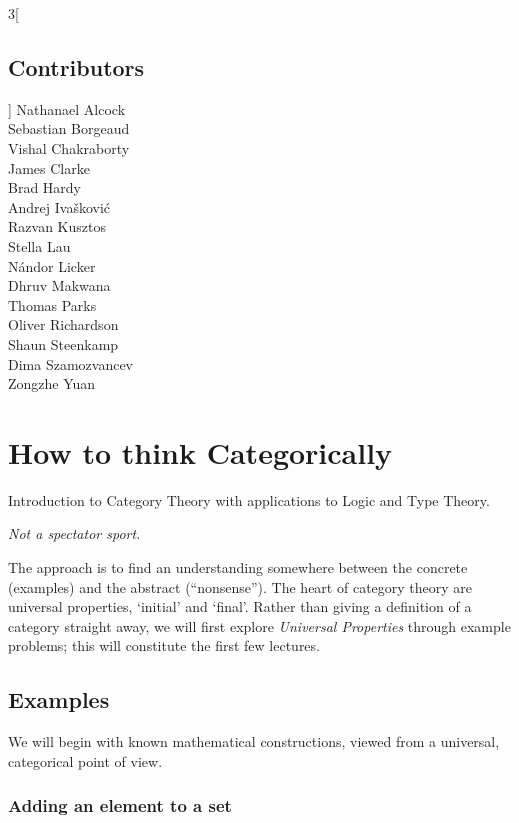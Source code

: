 \thispagestyle{plain}
\begin{multicols}{3}[\section*{Contributors}]
Nathanael Alcock\\
Sebastian Borgeaud\\
Vishal Chakraborty\\
James Clarke\\
Brad Hardy\\
Andrej Ivašković\\
Razvan Kusztos\\
Stella Lau\\
Nándor Licker\\
Dhruv Makwana\\
Thomas Parks\\
Oliver Richardson\\
Shaun Steenkamp\\
Dima Szamozvancev\\
Zongzhe Yuan\\
\end{multicols}
\clearpage


\tableofcontents

\newpage

\chapter{How to think Categorically}

Introduction to Category Theory with applications to Logic and Type Theory.

\emph{Not a spectator sport.}

The approach is to find an understanding somewhere between the concrete
(examples) and the abstract (``nonsense''). The heart of category theory are
universal properties, `initial' and `final'.
Rather than giving a definition of a category straight away, we will first
explore \emph{Universal Properties} through example problems; this will
constitute the first few lectures.

\section{Examples}
We will begin with known mathematical constructions, viewed from a universal,
categorical point of view.

\subsection{Adding an element to a set}
\label{add-element-set}

